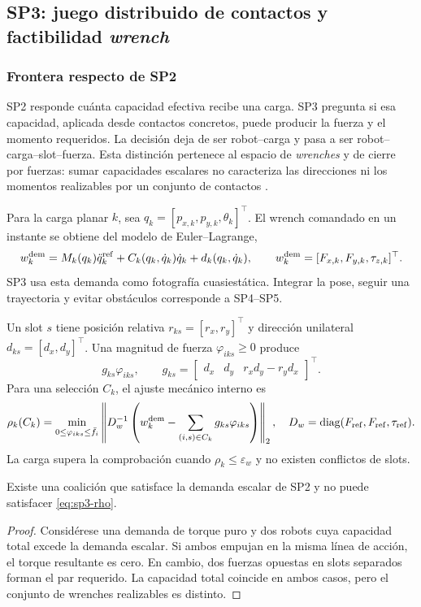 \subsection{SP3: juego distribuido de contactos y factibilidad \emph{wrench}}
\label{sec:resultados-sp3}

\subsubsection{Frontera respecto de SP2}

SP2 responde cuánta capacidad efectiva recibe una carga. SP3 pregunta si esa
capacidad, aplicada desde contactos concretos, puede producir la fuerza y el momento
requeridos. La decisión deja de ser robot--carga y pasa a ser
robot--carga--slot--fuerza. Esta distinción pertenece al espacio de \emph{wrenches} y
de cierre por fuerzas: sumar capacidades escalares no caracteriza las direcciones ni
los momentos realizables por un conjunto de contactos
\citep{ferrari1992grasps,bicchi1995closure}.

Para la carga planar $k$, sea
$q_k=[p_{x,k},p_{y,k},\theta_k]^\top$. El wrench comandado en un instante se obtiene
del modelo de Euler--Lagrange,
\[
 w_k^{\rm dem}
 =M_k(q_k)\ddot q_k^{\rm ref}
 +C_k(q_k,\dot q_k)\dot q_k+d_k(q_k,\dot q_k),
 \qquad
 w_k^{\rm dem}=[F_{x,k},F_{y,k},\tau_{z,k}]^\top .
\]
SP3 usa esta demanda como fotografía cuasiestática. Integrar la pose, seguir una
trayectoria y evitar obstáculos corresponde a SP4--SP5.

Un slot $s$ tiene posición relativa $r_{ks}=[r_x,r_y]^\top$ y dirección unilateral
$d_{ks}=[d_x,d_y]^\top$. Una magnitud de fuerza $\varphi_{iks}\geq0$ produce
\[
 g_{ks}\varphi_{iks},\qquad
 g_{ks}=
 \begin{bmatrix}
 d_x & d_y & r_xd_y-r_yd_x
 \end{bmatrix}^{\!\top}.
\]
Para una selección $C_k$, el ajuste mecánico interno es
\[
 \rho_k(C_k)=
 \min_{0\leq\varphi_{iks}\leq\bar f_i}
 \left\|D_w^{-1}
 \left(w_k^{\rm dem}-\sum_{(i,s)\in C_k}g_{ks}\varphi_{iks}\right)
 \right\|_2 ,
 \quad D_w=\operatorname{diag}(F_{\rm ref},F_{\rm ref},\tau_{\rm ref}).
 \label{eq:sp3-rho}
\]
La carga supera la comprobación cuando $\rho_k\leq\varepsilon_w$ y no existen conflictos
de slots.

\begin{proposicion}
Existe una coalición que satisface la demanda escalar de SP2 y no puede satisfacer
\eqref{eq:sp3-rho}.
\end{proposicion}
\begin{proof}
Considérese una demanda de torque puro y dos robots cuya capacidad total excede la
demanda escalar. Si ambos empujan en la misma línea de acción, el torque resultante
es cero. En cambio, dos fuerzas opuestas en slots separados forman el par requerido.
La capacidad total coincide en ambos casos, pero el conjunto de wrenches realizables
es distinto.
\end{proof}

